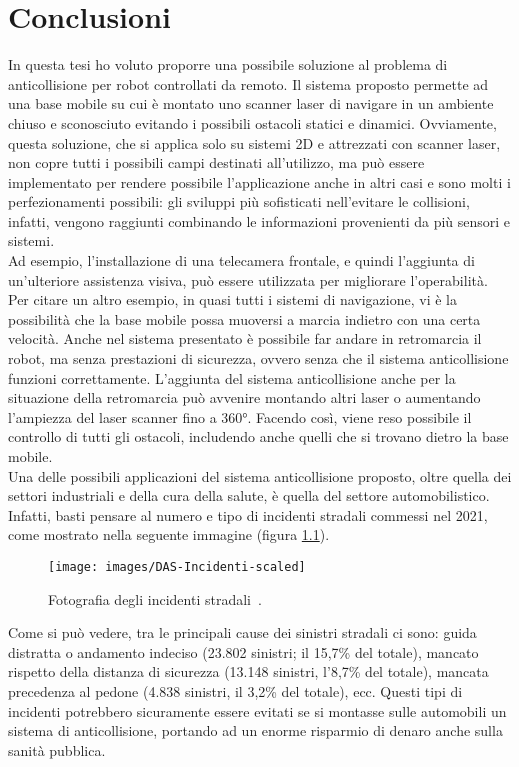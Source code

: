 \chapter{Conclusioni}
\label{Conclusioni}

In questa tesi ho voluto proporre una possibile soluzione al problema di anticollisione per robot controllati da remoto. Il sistema proposto permette ad una base mobile su cui è montato uno scanner laser di navigare in un ambiente chiuso e sconosciuto evitando i possibili ostacoli statici e dinamici. Ovviamente, questa soluzione, che si applica solo su sistemi 2D e attrezzati con scanner laser, non copre tutti i possibili campi destinati all’utilizzo, ma può essere implementato per rendere possibile l’applicazione anche in altri casi e sono molti i perfezionamenti possibili: gli sviluppi più sofisticati nell'evitare le collisioni, infatti, vengono raggiunti combinando le informazioni provenienti da più sensori e sistemi.\\

Ad esempio, l’installazione di una telecamera frontale, e quindi l’aggiunta di un’ulteriore assistenza visiva, può essere utilizzata per migliorare l’operabilità.
Per citare un altro esempio, in quasi tutti i sistemi di navigazione, vi è la possibilità che la base mobile possa muoversi a marcia indietro con una certa velocità. Anche nel sistema presentato è possibile far andare in retromarcia il robot, ma senza prestazioni di sicurezza, ovvero senza che il sistema anticollisione funzioni correttamente. L’aggiunta del sistema anticollisione anche per la situazione della retromarcia può avvenire montando altri laser o aumentando l’ampiezza del laser scanner fino a 360°. Facendo così, viene reso possibile il controllo di tutti gli ostacoli, includendo anche quelli che si trovano dietro la base mobile. \\

Una delle possibili applicazioni del sistema anticollisione proposto, oltre quella dei settori industriali e della cura della salute, è quella del settore automobilistico. Infatti, basti pensare al numero e tipo di incidenti stradali commessi nel 2021, come mostrato nella seguente immagine (figura \ref{fig:das-incidenti-scaled}). 
\begin{figure}[h]
	\centering
	\texttt{[image: images/DAS-Incidenti-scaled]}
	\caption{Fotografia degli incidenti stradali~\cite{28}.}
	\label{fig:das-incidenti-scaled}
\end{figure}
Come si può vedere, tra le principali cause dei sinistri stradali ci sono: guida distratta o andamento indeciso (23.802 sinistri; il 15,7\% del totale), mancato rispetto della distanza di sicurezza (13.148 sinistri, l’8,7\% del totale), mancata precedenza al pedone (4.838 sinistri, il 3,2\% del totale), ecc. Questi tipi di incidenti potrebbero sicuramente essere evitati se si montasse sulle automobili un sistema di anticollisione, portando ad un enorme risparmio di denaro anche sulla sanità pubblica.\\\\

